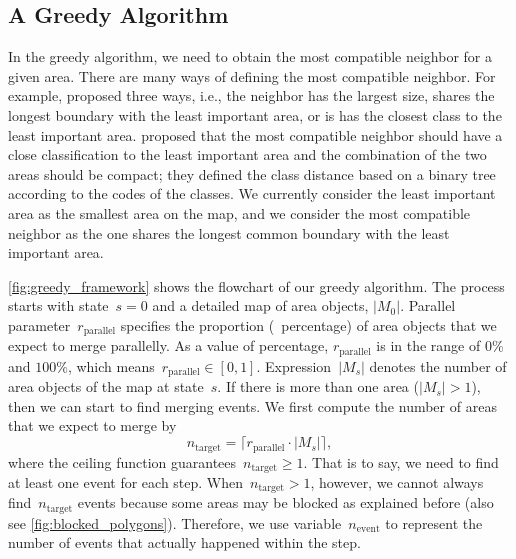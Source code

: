 \documentclass[ijgi,article,submit,moreauthors,pdftex]{Definitions/mdpi}
\begin{document}
\subsection{A Greedy Algorithm}
\label{sec:greedy_algo}

In the greedy algorithm, we need to obtain the most compatible neighbor 
for a given area.
There are many ways of defining the most compatible neighbor.
For example, \citet{Cheng2006} proposed three ways, i.e.,
the neighbor has the largest size, 
shares the longest boundary with the least important area,
or is has the closest class to the least important area. 
\citet{Peng2017AStar} proposed that 
the most compatible neighbor should have a close classification
to the least important area
and the combination of the two areas should be compact;
they defined the class distance based on a binary tree
according to the codes of the classes.
We currently consider the least important area 
as the smallest area on the map,
and we consider the most compatible neighbor
as the one shares the longest common boundary 
with the least important area.

\fig\ref{fig:greedy_framework} shows the flowchart of our greedy algorithm.
The process starts with state~$s=0$ and a detailed map of area objects, $|M_0|$.
Parallel parameter~$r_\mathrm{parallel}$ specifies 
the proportion (\ie~percentage) of area objects that
we expect to merge parallelly.
As a value of percentage, $r_\mathrm{parallel}$ is in the range of $0\%$ and $100\%$,
which means~$r_\mathrm{parallel} \in [0,1]$.
Expression~$|M_s|$ denotes the number of area objects of the map at state~$s$.
If there is more than one area ($|M_s|>1$),
then we can start to find merging events.
We first compute the number of areas that we expect to merge by
\begin{equation}
\label{eq:n_target}
n_\mathrm{target} =
\lceil r_\mathrm{parallel} \cdot |M_s| \rceil,
\end{equation}
where the ceiling function guarantees~$n_\mathrm{target}\ge 1$.
That is to say, we need to find at least one event for each step.
When~$n_\mathrm{target} > 1$, however,
we cannot always find~$n_\mathrm{target}$ events
because some areas may be blocked as explained before
(also see \fig\ref{fig:blocked_polygons}).
Therefore, we use variable~$n_\mathrm{event}$
to represent the number of events that actually happened within the step. 
\end{document}
